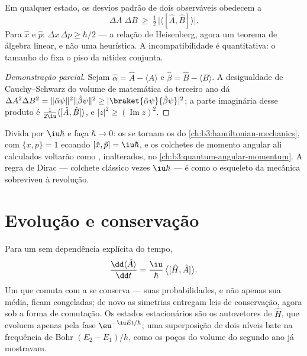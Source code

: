 \begin{theorem}\label{thm:b3:quantum-formalism:uncertainty}
Em qualquer estado, os desvios padrão de dois observáveis obedecem a
\[
\Delta A\;\Delta B \ \ge\ \tfrac12\,\big|\langle[\hat A, \hat
B]\rangle\big| .
\]
Para $\hat x$ e $\hat p$: $\Delta x\,\Delta p \ge \hbar/2$ --- a
relação de Heisenberg, agora um teorema de álgebra linear, e não uma
heurística. A incompatibilidade é quantitativa: o tamanho do 
fixa o piso da nitidez conjunta.
\end{theorem}

\begin{proof}[Demonstração parcial]
Sejam $\hat\alpha = \hat A - \langle A\rangle$ e $\hat\beta = \hat B -
\langle B\rangle$. A desigualdade de Cauchy--Schwarz do volume de
matemática do terceiro ano dá $\Delta A^2\Delta B^2 =
\|\hat\alpha\psi\|^2\|\hat\beta\psi\|^2 \ge
|\braket{\hat\alpha\psi}{\hat\beta\psi}|^2$; a parte imaginária desse
produto é $\tfrac1{2\iu}\langle[\hat A, \hat B]\rangle$, e
$|z|^2 \ge (\operatorname{Im}z)^2$.
\end{proof}

\begin{remark}\label{rem:b3:quantum-formalism:poisson}
Divida por $\iu\hbar$ e faça $\hbar \to 0$: os  se tornam
os  do \cref{ch:b3:hamiltonian-mechanics}, com
$\{x, p\} =
1$ ecoando $[\hat x, \hat p] = \iu\hbar$, e os colchetes de momento
angular ali calculados voltarão como , inalterados, no
\cref{ch:b3:quantum-angular-momentum}. A regra de Dirac --- colchete
clássico vezes $\iu\hbar$ --- é como o esqueleto da mecânica
sobreviveu à revolução.
\end{remark}

\section{Evolução e conservação}

\begin{proposition}\label{prop:b3:quantum-formalism:evolution}
Para um  sem dependência explícita do tempo,
\[
\frac{\dd\langle\hat A\rangle}{\dd t}
 = \frac{\iu}{\hbar}\,\big\langle[\hat H, \hat A]\big\rangle .
\]
Um  que comuta com a  se conserva --- suas
probabilidades, e não apenas sua média, ficam congeladas; de novo as
simetrias entregam leis de conservação, agora sob a forma de comutação.
Os estados estacionários são os autovetores de $\hat H$, que evoluem
apenas pela fase $\eu^{-\iu Et/\hbar}$; uma superposição de dois níveis
bate na frequência de Bohr $(E_2 - E_1)/h$, como os poços do volume do
segundo ano já mostravam.
\end{proposition}


